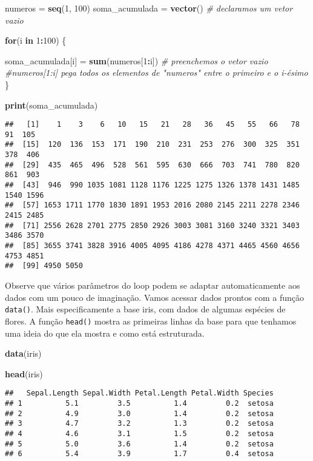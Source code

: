 \documentclass[]{article}
\newenvironment{Shaded}{\begin{snugshade}}{\end{snugshade}}
\newcommand{\CommentTok}[1]{\textcolor[rgb]{0.56,0.35,0.01}{\textit{#1}}}
\newcommand{\ControlFlowTok}[1]{\textcolor[rgb]{0.13,0.29,0.53}{\textbf{#1}}}
\newcommand{\DecValTok}[1]{\textcolor[rgb]{0.00,0.00,0.81}{#1}}
\newcommand{\KeywordTok}[1]{\textcolor[rgb]{0.13,0.29,0.53}{\textbf{#1}}}
\newcommand{\NormalTok}[1]{#1}
\newcommand{\OperatorTok}[1]{\textcolor[rgb]{0.81,0.36,0.00}{\textbf{#1}}}
\newcommand{\StringTok}[1]{\textcolor[rgb]{0.31,0.60,0.02}{#1}}
\begin{document}
\begin{Shaded}
\begin{Highlighting}[]
\NormalTok{numeros =}\StringTok{ }\KeywordTok{seq}\NormalTok{(}\DecValTok{1}\NormalTok{, }\DecValTok{100}\NormalTok{)}
\NormalTok{soma_acumulada =}\StringTok{ }\KeywordTok{vector}\NormalTok{() }\CommentTok{# declaramos um vetor vazio}

\ControlFlowTok{for}\NormalTok{(i }\ControlFlowTok{in} \DecValTok{1}\OperatorTok{:}\DecValTok{100}\NormalTok{) \{}
  
\NormalTok{  soma_acumulada[i] =}\StringTok{ }\KeywordTok{sum}\NormalTok{(numeros[}\DecValTok{1}\OperatorTok{:}\NormalTok{i]) }\CommentTok{# preenchemos o vetor vazio}
  \CommentTok{#numeros[1:i] pega todos os elementos de "numeros" entre o primeiro e o i-ésimo}
\NormalTok{\}}

\KeywordTok{print}\NormalTok{(soma_acumulada)}
\end{Highlighting}
\end{Shaded}

\begin{verbatim}
##   [1]    1    3    6   10   15   21   28   36   45   55   66   78   91  105
##  [15]  120  136  153  171  190  210  231  253  276  300  325  351  378  406
##  [29]  435  465  496  528  561  595  630  666  703  741  780  820  861  903
##  [43]  946  990 1035 1081 1128 1176 1225 1275 1326 1378 1431 1485 1540 1596
##  [57] 1653 1711 1770 1830 1891 1953 2016 2080 2145 2211 2278 2346 2415 2485
##  [71] 2556 2628 2701 2775 2850 2926 3003 3081 3160 3240 3321 3403 3486 3570
##  [85] 3655 3741 3828 3916 4005 4095 4186 4278 4371 4465 4560 4656 4753 4851
##  [99] 4950 5050
\end{verbatim}

Observe que vários parâmetros do loop podem se adaptar automaticamente
aos dados com um pouco de imaginação. Vamos acessar dados prontos com a
função \texttt{data()}. Mais especificamente a base iris, com dados de
algumas espécies de flores. A função \texttt{head()} mostra as primeiras
linhas da base para que tenhamos uma ideia do que ela mostra e como está
estruturada.

\begin{Shaded}
\begin{Highlighting}[]
\KeywordTok{data}\NormalTok{(iris)}

\KeywordTok{head}\NormalTok{(iris)}
\end{Highlighting}
\end{Shaded}

\begin{verbatim}
##   Sepal.Length Sepal.Width Petal.Length Petal.Width Species
## 1          5.1         3.5          1.4         0.2  setosa
## 2          4.9         3.0          1.4         0.2  setosa
## 3          4.7         3.2          1.3         0.2  setosa
## 4          4.6         3.1          1.5         0.2  setosa
## 5          5.0         3.6          1.4         0.2  setosa
## 6          5.4         3.9          1.7         0.4  setosa
\end{verbatim}
\end{document}
